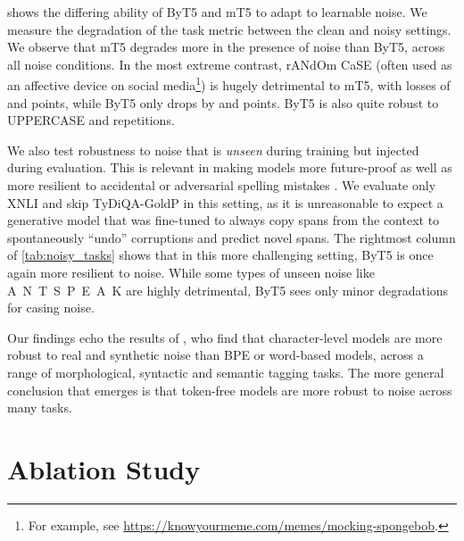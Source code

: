 \documentclass[11pt,a4paper]{article}
\begin{document}
 shows the differing ability of ByT5 and mT5 to adapt to learnable noise. We measure the degradation of the task metric between the clean and noisy settings. We observe that mT5 degrades more in the presence of noise than ByT5, across all noise conditions. In the most extreme contrast, rANdOm CaSE (often used as an affective device on social media\footnote{For example, see \url{https://knowyourmeme.com/memes/mocking-spongebob}.}) is hugely detrimental to mT5, with losses of  and  points, while ByT5 only drops by  and  points. ByT5 is also quite robust to UPPERCASE and repetitions.

We also test robustness to noise that is \emph{unseen} during training but injected during evaluation. This is relevant in making models more future-proof as well as more resilient to accidental or adversarial spelling mistakes \cite{pruthi-etal-2019-combating, sun-2020-adv-bert}. We evaluate only XNLI and skip TyDiQA-GoldP in this setting, as it is unreasonable to expect a generative model that was fine-tuned to always copy spans from the context to spontaneously ``undo'' corruptions and predict novel spans. The rightmost column of \cref{tab:noisy_tasks} shows that in this more challenging setting, ByT5 is once again more resilient to noise. While some types of unseen noise like A~N~T~S~P~E~A~K are highly detrimental, ByT5 sees only minor degradations for casing noise.

Our findings echo the results of \citet{durrani-etal-2019-one}, who find that character-level models are more robust to real and synthetic noise than BPE or word-based models, across a range of morphological, syntactic and semantic tagging tasks. The more general conclusion that emerges is that token-free models are more robust to noise across many tasks.

\section{Ablation Study}
\label{sec:ablations}
\end{document}
